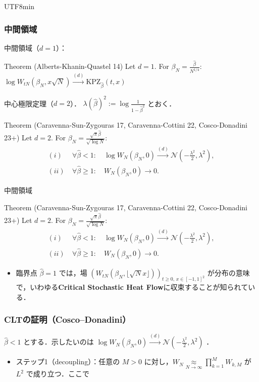 \documentclass{beamer}
\renewcommand{\b}{\beta}
\newcommand{\cvlaw}{\stackrel{{ (d)}}{\longrightarrow}}
\begin{document}
\begin{CJK*}{UTF8}{min}
\begin{frame}
\frametitle{中間領域}
中間領域（$d=1$）：
\begin{block}{Theorem (Alberts-Khanin-Quastel 14)}
Let $d=1$. For $\beta_N = \frac{\hat \beta}{N^{1/4}}$: \ $\log W_{tN}(\beta_N,x\sqrt N) \cvlaw \mathrm{KPZ}_{\hat{\beta}}(t,x)$
\end{block}
\pause[2]
中心極限定理（$d=2$）．
$\lambda(\hat \beta)^2 := \log \frac{1}{1-\hat{\beta}^2}$ とおく．
\begin{block}{Theorem (Caravenna-Sun-Zygouras 17, Caravenna-Cottini 22, Cosco-Donadini 23+)}
Let $d=2$. For $\beta_N = \frac{\sqrt{\pi}\hat \beta}{\sqrt{\log N}}:$
  \begin{align*}
 (i) &\ \forall \hat{\b}<1:\quad \log W_N(\beta_N,0) \cvlaw \mathcal N\left(-\frac {\lambda^2} 2,\lambda^2\right),\\
 (ii) &\ \forall \hat{\beta} \geq 1: \quad W_N(\beta_N,0)\to 0.
  \end{align*}
\end{block}
\end{frame}
\begin{frame}{中間領域}
\begin{block}{Theorem (Caravenna-Sun-Zygouras 17, Caravenna-Cottini 22, Cosco-Donadini 23+)}
Let $d=2$. For $\beta_N = \frac{\sqrt{\pi}\hat \beta}{\sqrt{\log N}}:$
  \begin{align*}
 (i) &\ \forall \hat{\b}<1:\quad \log W_N(\beta_N,0) \cvlaw \mathcal N\left(-\frac {\lambda^2} 2,\lambda^2\right),\\
 (ii) &\ \forall \hat{\beta} \geq 1: \quad W_N(\beta_N,0)\to 0.
  \end{align*}
\end{block}
\begin{itemize}
    \item 臨界点 $\hat{\beta}=1$ では，場 $(W_{tN}(\beta_N,\lfloor \sqrt N x\rfloor))_{t\geq 0,\,x\in [-1,1]^2}$ が分布の意味で，いわゆる\textbf{Critical Stochastic Heat Flow}に収束することが知られている．
\end{itemize}
\end{frame}
\begin{frame}
  \frametitle{CLTの証明（Cosco--Donadini）}
$\hat \beta<1$ とする．示したいのは $\log W_N(\beta_N,0) \cvlaw \mathcal N\left(-\frac {\lambda^2} 2,\lambda^2\right)$ ．
\begin{itemize}
  \item<1-> ステップ1（decoupling）：任意の $M>0$ に対し，$W_N\underset{N\to\infty}{\approx} \prod_{k=1}^M W_{k,M}$ が $L^2$ で成り立つ．ここで

\end{itemize}
\end{frame}
\end{CJK*}
\end{document}
